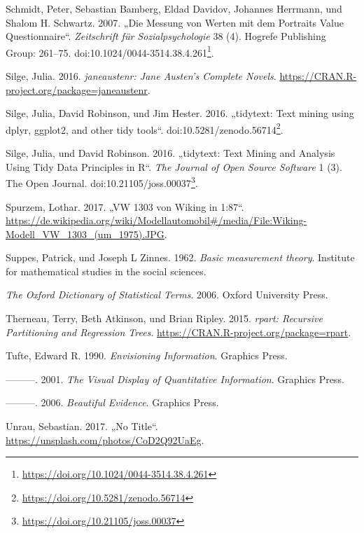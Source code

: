 \documentclass[12pt,ngerman,]{book}
\let\rmarkdownfootnote\footnote%
\def\footnote{\protect\rmarkdownfootnote}
\renewcommand{\href}[2]{#2\footnote{\url{#1}}}
\begin{document}
\hypertarget{ref-Schmidt2007}{}
Schmidt, Peter, Sebastian Bamberg, Eldad Davidov, Johannes Herrmann, und
Shalom H. Schwartz. 2007. „Die Messung von Werten mit dem Portraits
Value Questionnaire``. \emph{Zeitschrift für Sozialpsychologie} 38 (4).
Hogrefe Publishing Group: 261--75.
doi:\href{https://doi.org/10.1024/0044-3514.38.4.261}{10.1024/0044-3514.38.4.261}.

\hypertarget{ref-R-janeaustenr}{}
Silge, Julia. 2016. \emph{janeaustenr: Jane Austen's Complete Novels}.
\url{https://CRAN.R-project.org/package=janeaustenr}.

\hypertarget{ref-tidytext-archive}{}
Silge, Julia, David Robinson, und Jim Hester. 2016. „tidytext: Text
mining using dplyr, ggplot2, and other tidy tools``.
doi:\href{https://doi.org/10.5281/zenodo.56714}{10.5281/zenodo.56714}.

\hypertarget{ref-Silge2016}{}
Silge, Julia, und David Robinson. 2016. „tidytext: Text Mining and
Analysis Using Tidy Data Principles in R``. \emph{The Journal of Open
Source Software} 1 (3). The Open Journal.
doi:\href{https://doi.org/10.21105/joss.00037}{10.21105/joss.00037}.

\hypertarget{ref-spurzem_vw_2017}{}
Spurzem, Lothar. 2017. „VW 1303 von Wiking in 1:87``.
\url{https://de.wikipedia.org/wiki/Modellautomobil\#/media/File:Wiking-Modell_VW_1303_(um_1975).JPG}.

\hypertarget{ref-suppes1962basic}{}
Suppes, Patrick, und Joseph L Zinnes. 1962. \emph{Basic measurement
theory}. Institute for mathematical studies in the social sciences.

\hypertarget{ref-oxford}{}
\emph{The Oxford Dictionary of Statistical Terms}. 2006. Oxford
University Press.

\hypertarget{ref-R-rpart}{}
Therneau, Terry, Beth Atkinson, und Brian Ripley. 2015. \emph{rpart:
Recursive Partitioning and Regression Trees}.
\url{https://CRAN.R-project.org/package=rpart}.

\hypertarget{ref-1930824149}{}
Tufte, Edward R. 1990. \emph{Envisioning Information}. Graphics Press.

\hypertarget{ref-1930824130}{}
---------. 2001. \emph{The Visual Display of Quantitative Information}.
Graphics Press.

\hypertarget{ref-1930824165}{}
---------. 2006. \emph{Beautiful Evidence}. Graphics Press.

\hypertarget{ref-unrau1}{}
Unrau, Sebastian. 2017. „No Title``.
\url{https://unsplash.com/photos/CoD2Q92UaEg}.
\end{document}
